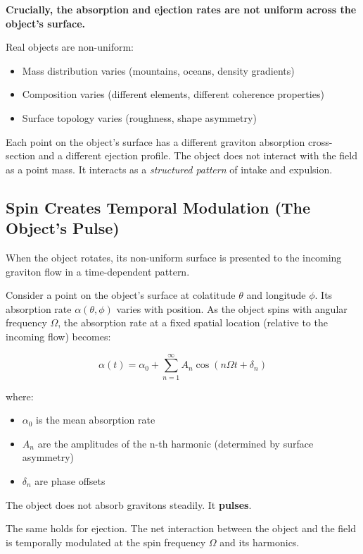 \documentclass[12pt, a4paper]{article}
\begin{document}
\textbf{Crucially, the absorption and ejection rates are not uniform across the object's surface.}

Real objects are non-uniform:
\begin{itemize}
    \item Mass distribution varies (mountains, oceans, density gradients)
    \item Composition varies (different elements, different coherence properties)
    \item Surface topology varies (roughness, shape asymmetry)
\end{itemize}

Each point on the object's surface has a different graviton absorption cross-section and a different ejection profile. The object does not interact with the field as a point mass. It interacts as a \textit{structured pattern} of intake and expulsion.

\subsection{Spin Creates Temporal Modulation (The Object's Pulse)}
\label{subsec:object_pulse}

When the object rotates, its non-uniform surface is presented to the incoming graviton flow in a time-dependent pattern.

Consider a point on the object's surface at colatitude \( \theta \) and longitude \( \phi \). Its absorption rate \( \alpha(\theta, \phi) \) varies with position. As the object spins with angular frequency \( \Omega \), the absorption rate at a fixed spatial location (relative to the incoming flow) becomes:

\[
\alpha(t) = \alpha_0 + \sum_{n=1}^{\infty} A_n \cos(n\Omega t + \delta_n)
\]

where:
\begin{itemize}
    \item \( \alpha_0 \) is the mean absorption rate
    \item \( A_n \) are the amplitudes of the n-th harmonic (determined by surface asymmetry)
    \item \( \delta_n \) are phase offsets
\end{itemize}

The object does not absorb gravitons steadily. It \textbf{pulses}.

The same holds for ejection. The net interaction between the object and the field is temporally modulated at the spin frequency \( \Omega \) and its harmonics.
\end{document}
